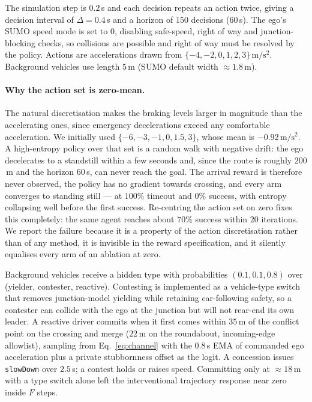 \documentclass[conference]{IEEEtran}
\begin{document}
The simulation step is $0.2$\,s and each decision repeats an action twice, giving
a decision interval of $\Delta = 0.4$\,s and a horizon of $150$ decisions
($60$\,s). The ego's SUMO speed mode is set to $0$, disabling safe-speed, right
of way and junction-blocking checks, so collisions are possible and right of way
must be resolved by the policy. Actions are accelerations drawn from
$\{-4, -2, 0, 1, 2, 3\}\,\mathrm{m/s^2}$. Background vehicles use length $5$\,m
(SUMO default width $\approx 1.8$\,m).

\paragraph{Why the action set is zero-mean.} The natural discretisation makes the
braking levels larger in magnitude than the accelerating ones, since emergency
decelerations exceed any comfortable acceleration. We initially used
$\{-6, -3, -1, 0, 1.5, 3\}$, whose mean is $-0.92\,\mathrm{m/s^2}$. A
high-entropy policy over that set is a random walk with negative drift: the ego
decelerates to a standstill within a few seconds and, since the route is roughly
$200$\,m and the horizon $60$\,s, can never reach the goal. The arrival reward is
therefore never observed, the policy has no gradient towards crossing, and every
arm converges to standing still --- at $100\%$ timeout and $0\%$ success, with
entropy collapsing well before the first success. Re-centring the action set on
zero fixes this completely: the same agent reaches about $70\%$ success within
$20$ iterations. We report the failure because it is a property of the action
discretisation rather than of any method, it is invisible in the reward
specification, and it silently equalises every arm of an ablation at zero.

Background vehicles receive a hidden type with probabilities
$(0.1, 0.1, 0.8)$ over (yielder, contester, reactive). Contesting is
implemented as a vehicle-type switch that removes junction-model yielding while
retaining car-following safety, so a contester can collide with the ego at the
junction but will not rear-end its own leader. A reactive driver commits when it
first comes within $35$\,m of the conflict point on the crossing and merge
($22$\,m on the roundabout, incoming-edge allowlist), sampling from
Eq.~\eqref{eq:channel} with the $0.8$\,s EMA of commanded ego acceleration plus
a private stubbornness offset as the logit. A concession issues
\texttt{slowDown} over $2.5$\,s; a contest holds or raises speed. Committing only
at $\approx 18$\,m with a type switch alone left the interventional trajectory
response near zero inside $F$ steps.
\end{document}
